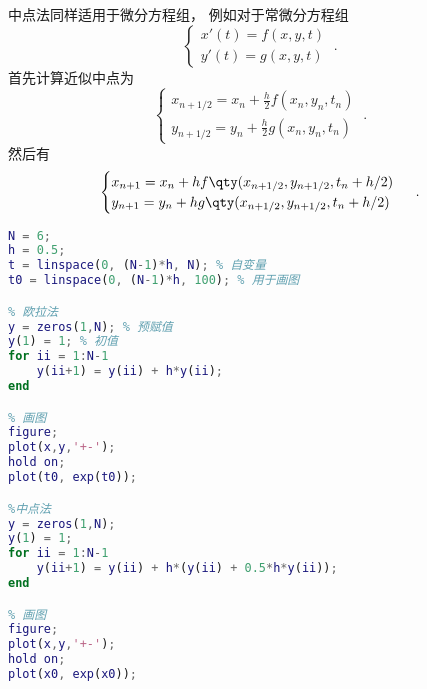 中点法同样适用于微分方程组， 例如对于常微分方程组
\begin{equation}
\begin{cases}
x'(t) = f(x, y, t)\\
y'(t) = g(x, y, t)
\end{cases}~.
\end{equation}
首先计算近似中点为
\begin{equation}
\begin{cases}
x_{n+1/2} = x_n + \frac{h}{2} f(x_n, y_n, t_n)\\
y_{n+1/2} = y_n + \frac{h}{2} g(x_n, y_n, t_n)
\end{cases}~.
\end{equation}
然后有
\begin{equation}\label{eq_OdeMid_7}
\begin{cases}
x_{n+1} = x_n + h f \qty(x_{n+1/2}, y_{n+1/2}, t_n + h/2)\\
y_{n+1} = y_n + h g \qty(x_{n+1/2}, y_{n+1/2}, t_n + h/2)
\end{cases}~.
\end{equation}

\begin{lstlisting}[language=matlab, caption=odeMid.m]
% 设置参数
N = 6;
h = 0.5;
t = linspace(0, (N-1)*h, N); % 自变量
t0 = linspace(0, (N-1)*h, 100); % 用于画图

% 欧拉法
y = zeros(1,N); % 预赋值
y(1) = 1; % 初值
for ii = 1:N-1
    y(ii+1) = y(ii) + h*y(ii);
end

% 画图
figure;
plot(x,y,'+-');
hold on;
plot(t0, exp(t0));

%中点法
y = zeros(1,N);
y(1) = 1;
for ii = 1:N-1
    y(ii+1) = y(ii) + h*(y(ii) + 0.5*h*y(ii));
end

% 画图
figure;
plot(x,y,'+-');
hold on;
plot(x0, exp(x0));
\end{lstlisting}

